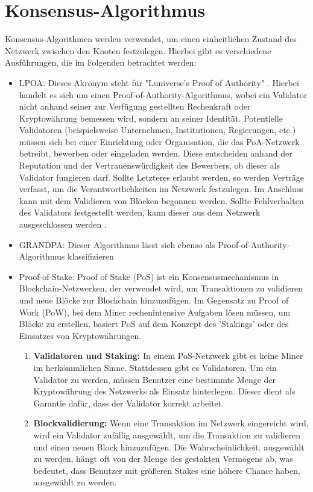 \section{Konsensus-Algorithmus}
Konsensus-Algorithmen werden verwendet, um einen einheitlichen Zustand des Netzwerk zwischen den Knoten festzulegen. Hierbei gibt es verschiedene Ausführungen, die im Folgenden betrachtet werden:
\begin{itemize}
	\item LPOA: Dieses Akronym steht für "Luniverse's Proof of Authority" \cite{ID50}. Hierbei handelt es sich um einen Proof-of-Authority-Algorithmus, wobei ein Validator nicht anhand seiner zur Verfügung gestellten Rechenkraft oder Kryptowährung bemessen wird, sondern an seiner Identität. Potentielle Validatoren (beispielsweise Unternehmen, Institutionen, Regierungen, etc.) müssen sich bei einer Einrichtung oder Organisation, die das PoA-Netzwerk betreibt, bewerben oder eingeladen werden. Diese entscheiden anhand der Reputation und der Vertrauenswürdigkeit des Bewerbers, ob dieser als Validator fungieren darf. Sollte Letzteres erlaubt werden, so werden Verträge verfasst, um die Verantwortlichkeiten im Netzwerk festzulegen. Im Anschluss kann mit dem Validieren von Blöcken begonnen werden. Sollte Fehlverhalten des Validators festgestellt werden, kann dieser aus dem Netzwerk ausgeschlossen werden \cite{ID51}.
	\item GRANDPA: Dieser Algorithmus lässt sich ebenso als Proof-of-Authority-Algorithmus klassifizieren
	\item Proof-of-Stake: Proof of Stake (PoS) ist ein Konsensusmechanismus in Blockchain-Netzwerken, der verwendet wird, um Transaktionen zu validieren und neue Blöcke zur Blockchain hinzuzufügen. Im Gegensatz zu Proof of Work (PoW), bei dem Miner rechenintensive Aufgaben lösen müssen, um Blöcke zu erstellen, basiert PoS auf dem Konzept des 'Stakings' oder des Einsatzes von Kryptowährungen.
	\begin{enumerate}
		\item \textbf{Validatoren und Staking:} In einem PoS-Netzwerk gibt es keine Miner im herkömmlichen Sinne. Stattdessen gibt es Validatoren. Um ein Validator zu werden, müssen Benutzer eine bestimmte Menge der Kryptowährung des Netzwerks als Einsatz hinterlegen. Dieser dient als Garantie dafür, dass der Validator korrekt arbeitet.
		
		\item \textbf{Blockvalidierung:} Wenn eine Transaktion im Netzwerk eingereicht wird, wird ein Validator zufällig ausgewählt, um die Transaktion zu validieren und einen neuen Block hinzuzufügen. Die Wahrscheinlichkeit, ausgewählt zu werden, hängt oft von der Menge des gestakten Vermögens ab, was bedeutet, dass Benutzer mit größeren Stakes eine höhere Chance haben, ausgewählt zu werden.
		

\end{enumerate}
\end{itemize}
